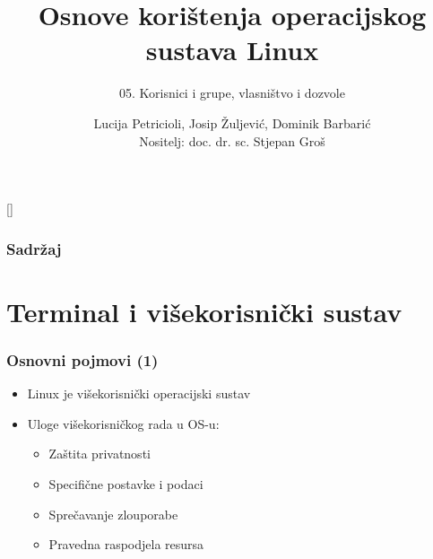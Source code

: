 \documentclass[table,usenames,dvipsnames] {beamer}
\title{Osnove korištenja operacijskog sustava Linux}
\subtitle{05. Korisnici i grupe, vlasništvo i dozvole}
\author[Lucija Petricioli, Josip Žuljević, Dominik Barbarić]{Lucija Petricioli, Josip Žuljević, Dominik Barbarić\\{\small Nositelj: doc. dr. sc. Stjepan Groš}}
\institute[FER]{Sveučilište u Zagrebu \\
				Fakultet elektrotehnike i računarstva}
\date{\todayiso}
\begin{document}
{
[] %

\begin{frame}
\maketitle
\end{frame}
}

\begin{frame}
\frametitle{Sadržaj}
\tableofcontents
\end{frame}

\section{Terminal i višekorisnički sustav}
\begin{frame}[t]
\frametitle{Osnovni pojmovi (1)}
\begin{itemize}
  \item Linux je višekorisnički operacijski sustav
  \item Uloge višekorisničkog rada u OS-u:
  \begin{itemize}
    \item Zaštita privatnosti
    \item Specifične postavke i podaci
    \item Sprečavanje zlouporabe
    \item Pravedna raspodjela resursa
  \end{itemize}
\end{itemize}
\end{frame}
\end{document}
